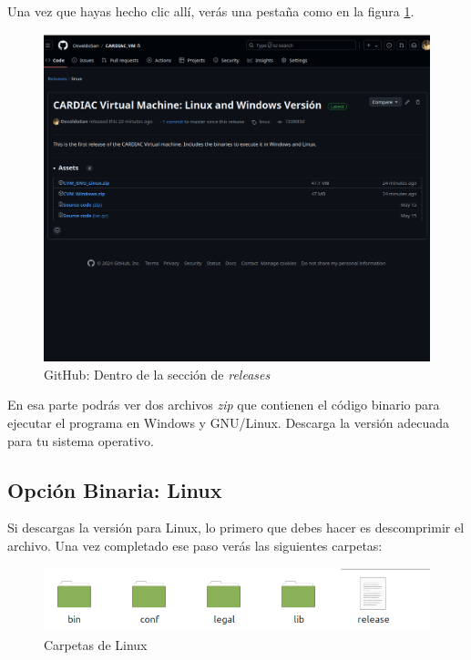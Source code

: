 \documentclass[letterpaper,12pt,oneside]{book}
\begin{document}
Una vez que hayas hecho clic allí, verás una pestaña como en la figura \ref{fig:github_relsecc2}.


\begin{figure}[h]		
				\centering
				\includegraphics[scale=0.28]{media_g/realse_section_1.png}
				\caption{GitHub: Dentro de la sección de \textit{releases}}
				\label{fig:github_relsecc2}
\end{figure}

En esa parte  podrás ver dos archivos \textit{zip} que contienen el código binario para ejecutar el programa en Windows y GNU/Linux. Descarga la versión adecuada para tu sistema operativo.

\clearpage

\subsection{Opción Binaria: Linux}

Si descargas la versión para Linux, lo primero que debes hacer es descomprimir el archivo. Una vez completado ese paso verás las siguientes carpetas:

\begin{figure}[h]		
				\centering
				\includegraphics[scale=0.3]{media_g/folders_linuxv.png}
				\caption{Carpetas de Linux}
				\label{fig:github_linuxfoolders}
\end{figure}
\end{document}
